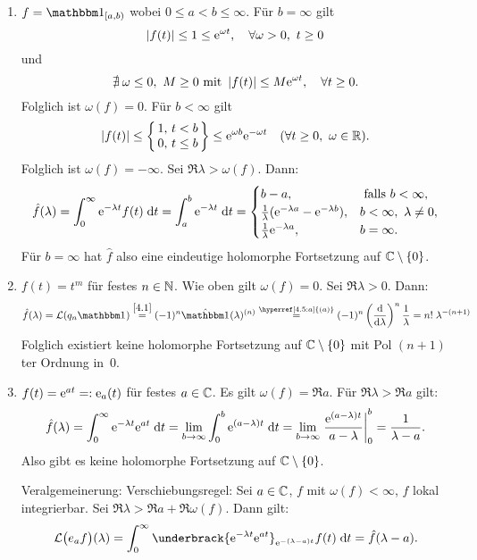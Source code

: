 \documentclass[a4paper,twoside,DIV15,BCOR12mm]{scrbook}
\begin{document}
\begin{bsp}\label{bsp4.5}\begin{enumerate}
\item\label{4.5:a} $f = \charfnkt{[a,b)}$ wobei $0\leq a<b\leq\infty$. Für $b=\infty$ gilt
\[\left\lvert f(t)\right\lvert\leq 1\leq\mathrm{e}^{\omega t},\quad\forall\omega>0,\ t\geq 0\]
und
\[\nexists\:\omega\leq0,\ M\geq0\text{ mit }\left\lvert f(t)\right\lvert\leq M\mathrm{e}^{\omega t},\quad\forall t\geq0.\]
Folglich ist $\omega(f)=0$. Für $b<\infty$ gilt
\[\abs{f(t)}\leq\left\{\!\!\begin{array}{r @{,\ } l}1&t<b\\0&t\leq b\end{array}\!\!\right\}\leq\e^{\omega b}\e^{-\omega t}\quad(\forall t\geq0,\ \omega\in\R).\]
Folglich ist $\omega(f)=-\infty$. Sei $\Re{\lambda}>\omega(f)$. Dann:
\[\hat{f}(\lambda)=\int_{0}^{\infty}{\mathrm{e}^{-\lambda t}f(t)}\;\mathrm{d} t = \int_{a}^{b}{\mathrm{e}^{-\lambda t}}\;\mathrm{d} t=\begin{cases}b-a,&\text{ falls }b<\infty,\\\frac{1}{\lambda}(\mathrm{e}^{-\lambda a}-\mathrm{e}^{-\lambda b}),&b<\infty,\ \lambda\neq 0,\\\frac{1}{\lambda}\mathrm{e}^{-\lambda a},&b=\infty.\end{cases}\]
Für $b=\infty$ hat $\hat{f}$ also eine eindeutige holomorphe Fortsetzung auf $\mathbb{C}\setminus\{0\}$.

\item $f(t) = t^m$ für festes $n\in\mathbb{N}$. Wie oben gilt $\omega(f)=0$. Sei $\Re{\lambda}>0$. Dann:
\[\hat{f}(\lambda)=\L(q_n\charfnkt{})\overset{\eqref{4.1}}{=}(-1)^n\hat{\charfnkt{}}(\lambda)^{(n)}\overset{\hyperref[4.5:a]{(a)}}{=}(-1)^n\left(\frac{\d}{\d\lambda}\right)^n\frac{1}{\lambda} = n!\;\lambda^{-(n+1)}\]
Folglich existiert keine holomorphe Fortsetzung auf $\mathbb{C}\setminus\{0\}$ mit Pol $(n+1)$ter Ordnung in~0.

\item\label{4.5:c} $f(t)=\mathrm{e}^{at}=:\mathrm{e}_a(t)$ für festes $a\in\mathbb{C}$. Es gilt $\omega(f)=\Re{a}$. Für $\Re{\lambda}>\Re{a}$ gilt:
\[\hat{f}(\lambda) = \int_{0}^{\infty}{\mathrm{e}^{-\lambda t}\mathrm{e}^{at}}\;\mathrm{d} t = \lim_{b\to\infty}\int_{0}^{b}{\mathrm{e}^{(a-\lambda) t}}\;\mathrm{d} t = \lim_{b\to\infty}\left.\frac{\mathrm{e}^{(a-\lambda)t}}{a-\lambda}\right|_0^b=\frac{1}{\lambda-a}.\]
Also gibt es keine holomorphe Fortsetzung auf $\mathbb{C}\setminus\{0\}$.

Veralgemeinerung: Verschiebungsregel: Sei $a\in\mathbb{C}$, $f$ mit $\omega(f)<\infty$, $f$ lokal integrierbar. Sei $\Re{\lambda}>\Re{a}+\Re{\omega(f)}$. Dann gilt:
\begin{equation}\label{4.6}
\L\bigl(e_af\bigr)(\lambda) = \integral{0}{\infty}{\underbrack{\e^{-\lambda t}\e^{at}}_{\e^{-(\lambda-a)t}}f(t)}{t} = \hat{f}(\lambda-a).
\end{equation}


\end{enumerate}
\end{bsp}
\end{document}

